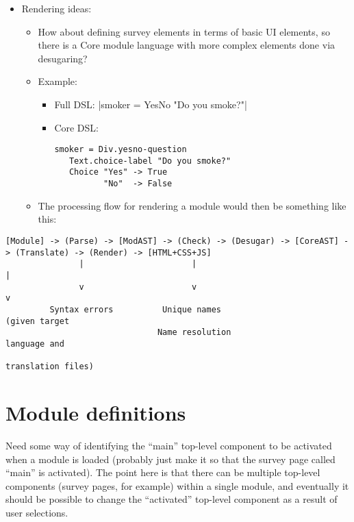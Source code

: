 \documentclass[DIV=calc,paper=a4,fontsize=11pt]{scrartcl}
\begin{document}
\begin{itemize}
{\begin{itemize}
{        feasibility of embedding to know whether we need to support a
        richer model in the DSL.}
    \end{itemize}}
  \item{Rendering ideas:
    \begin{itemize}
      \item{How about defining survey elements in terms of basic UI
        elements, so there is a Core module language with more complex
        elements done via desugaring?}
      \item{Example:
        \begin{itemize}
          \item{Full DSL: |smoker = YesNo "Do you smoke?"|}
          \item{Core DSL:
            \begin{Verbatim}
smoker = Div.yesno-question
   Text.choice-label "Do you smoke?"
   Choice "Yes" -> True
          "No"  -> False
\end{Verbatim}
}
        \end{itemize}}
      \item{The processing flow for rendering a module would then be
        something like this:}
    \end{itemize}}
\end{itemize}

{\tiny
\begin{Verbatim}
[Module] -> (Parse) -> [ModAST] -> (Check) -> (Desugar) -> [CoreAST] -> (Translate) -> (Render) -> [HTML+CSS+JS]
               |                      |                                      |
               v                      v                                      v
         Syntax errors          Unique names                          (given target
                               Name resolution                         language and
                                                                    translation files)
\end{Verbatim}
}

\section*{Module definitions}

Need some way of identifying the ``main'' top-level component to be
activated when a module is loaded (probably just make it so that the
survey page called ``main'' is activated).  The point here is that
there can be multiple top-level components (survey pages, for example)
within a single module, and eventually it should be possible to change
the ``activated'' top-level component as a result of user selections.
\end{document}
